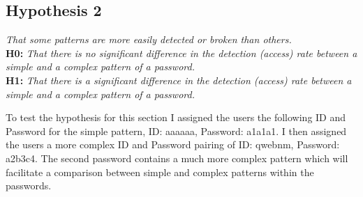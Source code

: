 \documentclass{article}
\begin{document}
\subsection{Hypothesis 2}
\begin{center}
\textit{That some patterns are more easily detected or broken than others.} \newline \\

\textbf{H0:} \textit{That	there	is no significant difference in	the	detection (access)	rate	between	a	simple	and	a	complex	pattern	of	a password.} \newline \\
\textbf{H1:} \textit{That	there	is a significant difference in	the	detection (access)	rate	between	a	simple	and	a	complex	pattern	of	a password.} \newline \\
\end{center}

To test the hypothesis for this section I assigned the users the following ID and Password for the simple pattern, ID: aaaaaa, Password: a1a1a1. I then assigned the users a more complex ID and Password pairing of ID: qwebnm, Password: a2b3c4. The second password contains a much more complex pattern which will facilitate a comparison between simple and complex patterns within the passwords. 
\end{document}
